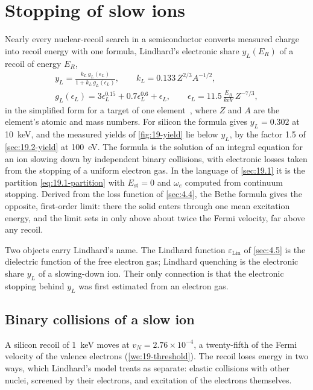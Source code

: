 \section{Stopping of slow ions}\label{sec:19.3}

Nearly every nuclear-recoil search in a semiconductor converts measured charge into recoil energy with one formula, Lindhard's electronic share $y_L(E_R)$ of a recoil of energy $E_R$,
\begin{equation}
  \begin{gathered}
  y_L = \frac{k_L\,g_L(\epsilon_L)}{1 + k_L\,g_L(\epsilon_L)} , \qquad k_L = 0.133\,Z^{2/3}A^{-1/2} , \\
  g_L(\epsilon_L) = 3\epsilon_L^{0.15} + 0.7\epsilon_L^{0.6} + \epsilon_L , \qquad \epsilon_L = 11.5\,\frac{E_R}{\si{keV}}\,Z^{-7/3} ,
  \end{gathered}
  \label{eq:16.6-lindhard}
\end{equation}
in the simplified form for a target of one element~\cite[Eq.~(3)]{agnese2018nuclear}, where $Z$ and $A$ are the element's atomic and mass numbers. For silicon the formula gives $y_L = 0.302$ at \SI{10}{keV}, and the measured yields of \cref{fig:19-yield} lie below $y_L$, by the factor 1.5 of \cref{sec:19.2-yield} at \SI{100}{eV}. The formula is the solution of an integral equation for an ion slowing down by independent binary collisions, with electronic losses taken from the stopping of a uniform electron gas. In the language of \cref{sec:19.1} it is the partition \cref{eq:19.1-partition} with $E_{\mathrm{st}} = 0$ and $\omega_e$ computed from continuum stopping. Derived from the loss function of \cref{sec:4.4}, the Bethe formula gives the opposite, first-order limit: there the solid enters through one mean excitation energy, and the limit sets in only above about twice the Fermi velocity, far above any recoil.

Two objects carry Lindhard's name. The Lindhard function $\varepsilon_{\mathrm{Lin}}$ of \cref{sec:4.5} is the dielectric function of the free electron gas; Lindhard quenching is the electronic share $y_L$ of a slowing-down ion. Their only connection is that the electronic stopping behind $y_L$ was first estimated from an electron gas.

\subsection{Binary collisions of a slow ion}\label{sec:19.3-binary}

A silicon recoil of \SI{1}{keV} moves at $v_N = 2.76\times10^{-4}$, a twenty-fifth of the Fermi velocity of the valence electrons (\cref{we:19-threshold}). The recoil loses energy in two ways, which Lindhard's model treats as separate: elastic collisions with other nuclei, screened by their electrons, and excitation of the electrons themselves.

